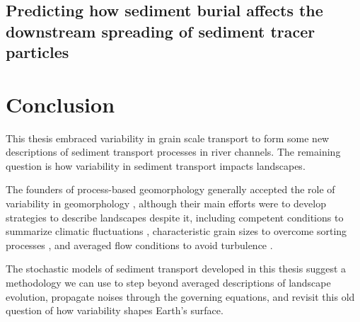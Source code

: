 \subsection{Predicting how sediment burial affects the downstream spreading of sediment tracer particles}


\section{Conclusion}

This thesis embraced variability in grain scale transport to form some new descriptions of sediment transport processes in river channels.
The remaining question is how variability in sediment transport impacts landscapes.

The founders of process-based geomorphology generally accepted the role of variability in geomorphology \citep{Horton1945,Strahler1952,Langbein1964}, although their main efforts were to develop strategies to describe landscapes despite it, including competent conditions to summarize climatic fluctuations \citep{Wolman1959,Wolman1978}, characteristic grain sizes to overcome sorting processes \citep{Parker1982,Andrews1983}, and averaged flow conditions to avoid turbulence \citep{MeyerPeter1948,Bagnold1954}.

The stochastic models of sediment transport developed in this thesis suggest a methodology we can use to step beyond averaged descriptions of landscape evolution, propagate noises through the governing equations, and revisit this old question of how variability shapes Earth's surface.
